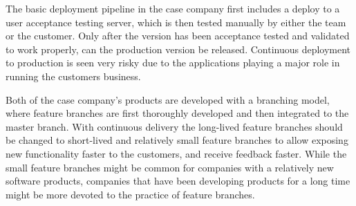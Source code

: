 \documentclass[lnbip]{svmultln}
\begin{document}
The basic deployment pipeline in the case company first includes a deploy to a user acceptance testing server, which is then tested manually by either the team or the customer. Only after the version has been acceptance tested and validated to work properly, can the production version be released. Continuous deployment to production is seen very risky due to the applications playing a major role in running the customers business. %

Both of the case company's products are developed with a branching model, where feature branches are first thoroughly developed and then integrated to the master branch. With continuous delivery the long-lived feature branches should be changed to short-lived and relatively small feature branches to allow exposing new functionality faster to the customers, and receive feedback faster. While the small feature branches might be common for companies with a relatively new software products, companies that have been developing products for a long time might be more devoted to the practice of feature branches. %

\end{document}
